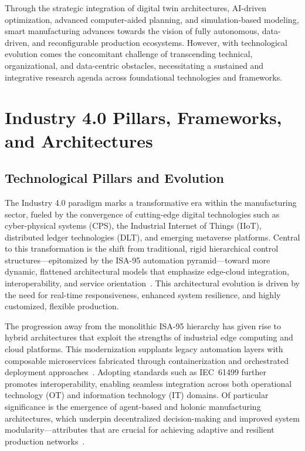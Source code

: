 Through the strategic integration of digital twin architectures, AI-driven optimization, advanced computer-aided planning, and simulation-based modeling, smart manufacturing advances towards the vision of fully autonomous, data-driven, and reconfigurable production ecosystems. However, with technological evolution comes the concomitant challenge of transcending technical, organizational, and data-centric obstacles, necessitating a sustained and integrative research agenda across foundational technologies and frameworks.

\section{Industry 4.0 Pillars, Frameworks, and Architectures}

\subsection{Technological Pillars and Evolution}

The Industry 4.0 paradigm marks a transformative era within the manufacturing sector, fueled by the convergence of cutting-edge digital technologies such as cyber-physical systems (CPS), the Industrial Internet of Things (IIoT), distributed ledger technologies (DLT), and emerging metaverse platforms. Central to this transformation is the shift from traditional, rigid hierarchical control structures—epitomized by the ISA-95 automation pyramid—toward more dynamic, flattened architectural models that emphasize edge-cloud integration, interoperability, and service orientation~\cite{ref1,ref9,ref11,ref16,ref18,ref27,ref30,ref37,ref38,ref44,ref45,ref57,ref59}. This architectural evolution is driven by the need for real-time responsiveness, enhanced system resilience, and highly customized, flexible production.

The progression away from the monolithic ISA-95 hierarchy has given rise to hybrid architectures that exploit the strengths of industrial edge computing and cloud platforms. This modernization supplants legacy automation layers with composable microservices fabricated through containerization and orchestrated deployment approaches~\cite{ref1}. Adopting standards such as IEC~61499 further promotes interoperability, enabling seamless integration across both operational technology (OT) and information technology (IT) domains. Of particular significance is the emergence of agent-based and holonic manufacturing architectures, which underpin decentralized decision-making and improved system modularity—attributes that are crucial for achieving adaptive and resilient production networks~\cite{ref11,ref37}.

